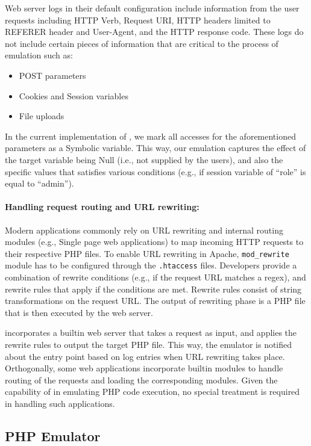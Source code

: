 Web server logs in their default configuration include information from the user requests including HTTP Verb, Request URI, HTTP headers limited to REFERER header and User-Agent, and the HTTP response code. 
These logs do not include certain pieces of information that are critical to the process of emulation such as:

\begin{itemize}
    \item POST parameters
    \item Cookies and Session variables
    \item File uploads
\end{itemize}

In the current implementation of \sys{}, we mark all accesses for the aforementioned parameters as a Symbolic variable. 
This way, our emulation captures the effect of the target variable being Null (i.e., not supplied by the users), and also the specific values that satisfies various conditions (e.g., if session variable of ``role'' is equal to ``admin''). 

\paragraph{Handling request routing and URL rewriting:} 

Modern applications commonly rely on URL rewriting and internal routing modules (e.g., Single page web applications) to map incoming HTTP requests to their respective PHP files. 
To enable URL rewriting in Apache, \texttt{mod\_rewrite} module has to be configured through the \texttt{.htaccess} files. 
Developers provide a combination of rewrite conditions (e.g., if the request URL matches a regex), and rewrite rules that apply if the conditions are met. 
Rewrite rules consist of string transformations on the request URL. 
The output of rewriting phase is a PHP file that is then executed by the web server. 

\sys{} incorporates a builtin web server that takes a request as input, and applies the rewrite rules to output the target PHP file. 
This way, the emulator is notified about the entry point based on log entries when URL rewriting takes place. 
Orthogonally, some web applications incorporate builtin modules to handle routing of the requests and loading the corresponding modules. 
Given the capability of \sys{} in emulating PHP code execution, no special treatment is required in handling such applications. 

\subsection{PHP Emulator}

